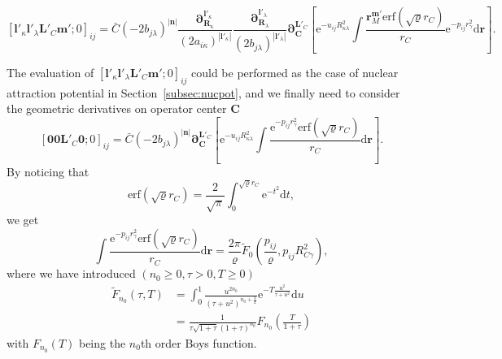\documentclass[a4paper,11pt,twoside,openright]{book}
\begin{document}
\begin{equation}
  \left[\boldsymbol{l}'_{\kappa}\boldsymbol{l}'_{\lambda}\boldsymbol{L}'_{C}\boldsymbol{m}';0\right]_{ij}
  =\bar{C}(-2b_{j\lambda})^{|\boldsymbol{n}|}%
    \frac{\boldsymbol{\partial}_{\boldsymbol{R}_{\kappa}}^{\boldsymbol{l}'_{\kappa}}}%
      {(2a_{i\kappa})^{|\boldsymbol{l}'_{\kappa}|}}%
    \frac{\boldsymbol{\partial}_{\boldsymbol{R}_{\lambda}}^{\boldsymbol{l}'_{\lambda}}}%
      {(2b_{j\lambda})^{|\boldsymbol{l}'_{\lambda}|}}%
    \boldsymbol{\partial}_{\boldsymbol{C}}^{\boldsymbol{L}'_{C}}%
    \left[\mathrm{e}^{-u_{ij}R_{\kappa\lambda}^2}\int%
      \frac{\boldsymbol{r}_{M}^{\boldsymbol{m}'}\mathrm{erf}\left(\sqrt{\varrho}r_{C}\right)}{r_{C}}%
        \mathrm{e}^{-p_{ij}r_{\gamma}^2}\mathrm{d}\boldsymbol{r}\right].
\end{equation}

The evaluation of $\left[\boldsymbol{l}'_{\kappa}\boldsymbol{l}'_{\lambda}\boldsymbol{L}'_{C}\boldsymbol{m}';0\right]_{ij}$
could be performed as the case of nuclear attraction potential in Section~\ref{subsec:nucpot}, and we finally need to
consider the geometric derivatives on operator center $\boldsymbol{C}$
\begin{equation}
  \left[\boldsymbol{00}\boldsymbol{L}'_{C}\boldsymbol{0};0\right]_{ij}
  =\bar{C}(-2b_{j\lambda})^{|\boldsymbol{n}|}%
    \boldsymbol{\partial}_{\boldsymbol{C}}^{\boldsymbol{L}'_{C}}%
    \left[\mathrm{e}^{-u_{ij}R_{\kappa\lambda}^2}%
      \int\frac{\mathrm{e}^{-p_{ij}r_{\gamma}^2}\mathrm{erf}\left(\sqrt{\varrho}r_{C}\right)}{r_{C}}\mathrm{d}\boldsymbol{r}\right].
\end{equation}
By noticing that
\begin{equation}
  \mathrm{erf}\left(\sqrt{\varrho}r_{C}\right)=\frac{2}{\sqrt{\pi}}\int_{0}^{\sqrt{\varrho}r_{C}}\mathrm{e}^{-t^{2}}\mathrm{d}t,
\end{equation}
we get
\begin{equation}
  \int\frac{\mathrm{e}^{-p_{ij}r_{\gamma}^2}\mathrm{erf}\left(\sqrt{\varrho}r_{C}\right)}{r_{C}}\mathrm{d}\boldsymbol{r}
  =\frac{2\pi}{\varrho}\tilde{F}_{0}\left(\frac{p_{ij}}{\varrho},p_{ij}R_{C\gamma}^2\right),
\end{equation}
where we have introduced $(n_{0}\ge0,\tau>0,T\ge0)$
\begin{align}
  \tilde{F}_{n_{0}}\left(\tau,T\right)
  &=\int_{0}^{1}\frac{u^{2n_{0}}}{(\tau+u^{2})^{n_{0}+\frac{3}{2}}}%
    \mathrm{e}^{-T\frac{u^{2}}{\tau+u^{2}}}\mathrm{d}u\\
  &=\frac{1}{\tau\sqrt{1+\tau}(1+\tau)^{n_{0}}}F_{n_{0}}\left(\frac{T}{1+\tau}\right)\nonumber
\end{align}
with $F_{n_{0}}(T)$ being the $n_{0}$th order Boys function.
\end{document}
